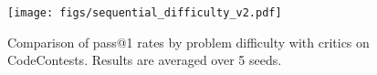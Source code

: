 \begin{figure}[b!]
    \centering
    \texttt{[image: figs/sequential\_difficulty\_v2.pdf]}
    \vspace{-7mm}
    \caption{Comparison of pass@1 rates by problem difficulty with {\ours} critics on CodeContests. Results are averaged over 5 seeds.}
    \label{fig:difficulty}
\end{figure}
